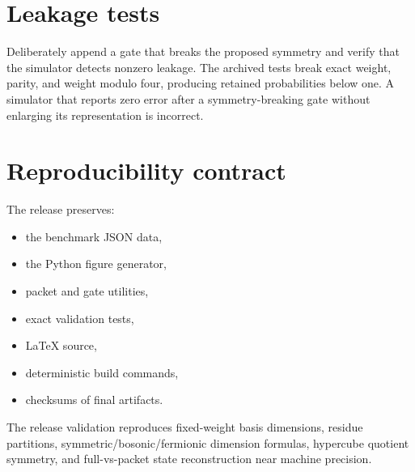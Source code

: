 \section{Leakage tests}
Deliberately append a gate that breaks the proposed symmetry and verify that the simulator detects nonzero leakage. The archived tests break exact weight, parity, and weight modulo four, producing retained probabilities below one. A simulator that reports zero error after a symmetry-breaking gate without enlarging its representation is incorrect.

\section{Reproducibility contract}
The release preserves:

\begin{itemize}
\item the benchmark JSON data,
\item the Python figure generator,
\item packet and gate utilities,
\item exact validation tests,
\item LaTeX source,
\item deterministic build commands,
\item checksums of final artifacts.
\end{itemize}

\begin{recordbox}
The release validation reproduces fixed-weight basis dimensions, residue partitions, symmetric/bosonic/fermionic dimension formulas, hypercube quotient symmetry, and full-vs-packet state reconstruction near machine precision.
\end{recordbox}
